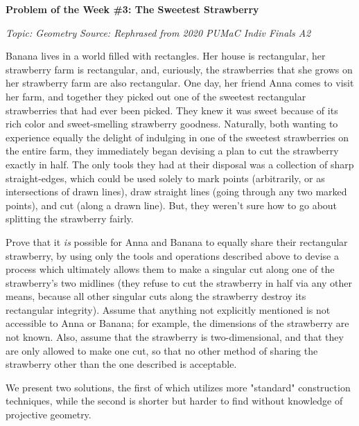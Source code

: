 \documentclass{article}
\newcommand{\V}{

\vspace{\baselineskip}

}
\begin{document}
\begin{potw}\vspace{5pt}
{\large\textbf{Problem of the Week \#3: The Sweetest Strawberry}}\vspace{5pt}

\textit{Topic: Geometry}\newline
\textit{Source: Rephrased from 2020 PUMaC Indiv Finals A2}\V

Banana lives in a world filled with rectangles. Her house is rectangular, her strawberry farm is rectangular, and, curiously, the strawberries that she grows on her strawberry farm are also rectangular. One day, her friend Anna comes to visit her farm, and together they picked out one of the sweetest rectangular strawberries that had ever been picked. They knew it was sweet because of its rich color and sweet-smelling strawberry goodness. Naturally, both wanting to experience equally the delight of indulging in one of the sweetest strawberries on the entire farm, they immediately began devising a plan to cut the strawberry exactly in half. The only tools they had at their disposal was a collection of sharp straight-edges, which could be used solely to mark points (arbitrarily, or as intersections of drawn lines), draw straight lines (going through any two marked points), and cut (along a drawn line). But, they weren't sure how to go about splitting the strawberry fairly.\V

Prove that it \textit{is} possible for Anna and Banana to equally share their rectangular strawberry, by using only the tools and operations described above to devise a process which ultimately allows them to make a singular cut along one of the strawberry's two midlines (they refuse to cut the strawberry in half via any other means, because all other singular cuts along the strawberry destroy its rectangular integrity). Assume that anything not explicitly mentioned is not accessible to Anna or Banana; for example, the dimensions of the strawberry are not known. Also, assume that the strawberry is two-dimensional, and that they are only allowed to make one cut, so that no other method of sharing the strawberry other than the one described is acceptable.
\end{potw}
\newpage

We present two solutions, the first of which utilizes more "standard" construction techniques, while the second is shorter but harder to find without knowledge of projective geometry. \V
\end{document}
